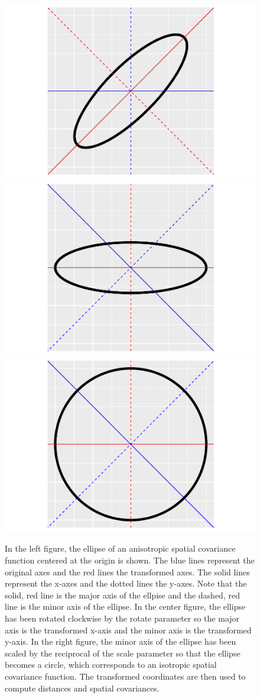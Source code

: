 \documentclass[10pt,letterpaper]{article}
\begin{document}
\begin{figure}
\includegraphics[width=0.33\linewidth]{supplementary_files/figure-latex/anisotropy2-1} \includegraphics[width=0.33\linewidth]{supplementary_files/figure-latex/anisotropy2-2} \includegraphics[width=0.33\linewidth]{supplementary_files/figure-latex/anisotropy2-3} \caption{In the left figure, the ellipse of an anisotropic spatial covariance function centered at the origin is shown. The blue lines represent the original axes and the red lines the transformed axes. The solid lines represent the x-axes and the dotted lines the y-axes. Note that the solid, red line is the major axis of the ellpise and the dashed, red line is the minor axis of the ellipse. In the center figure, the ellipse has been rotated clockwise by the rotate parameter so the major axis is the transformed x-axis and the minor axis is the transformed y-axis. In the right figure, the minor axis of the ellipse has been scaled by the reciprocal of the scale parameter so that the ellipse becomes a circle, which corresponds to an isotropic spatial covariance function. The transformed coordinates are then used to compute distances and spatial covariances.}\label{fig:anisotropy2}
\end{figure}
\end{document}
